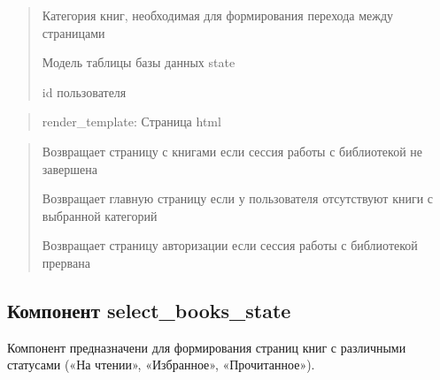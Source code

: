 \documentclass[letterpaper,10pt,russian]{sphinxmanual}
\begin{document}
\begin{fulllineitems}
\begin{description}
\begin{quote}
\begin{description}
\sphinxAtStartPar
Категория книг, необходимая для формирования перехода между страницами

\sphinxAtStartPar
Модель таблицы базы данных state

\sphinxAtStartPar
id пользователя

\end{description}\end{quote}

\end{description}
\begin{quote}\begin{description}
\sphinxAtStartPar
render\_template: Страница html

\end{description}\end{quote}
\begin{description}
\begin{quote}\begin{description}
\sphinxAtStartPar
Возвращает страницу с книгами если сессия работы с библиотекой  не завершена

\sphinxAtStartPar
Возвращает главную страницу если у пользователя отсутствуют книги с выбранной категорий

\sphinxAtStartPar
Возвращает страницу авторизации если сессия работы с библиотекой прервана

\end{description}\end{quote}

\end{description}

\end{fulllineitems}



\subsection{Компонент select\_books\_state}
\label{\detokenize{blueprints:select-books-state}}
\begin{DUlineblock}{0em}
\item[] Компонент предназначени для формирования страниц книг с различными статусами («На чтении», «Избранное», «Прочитанное»).
\end{DUlineblock}
\label{\detokenize{blueprints:module-blueprints.select_books_state}}
\end{document}
